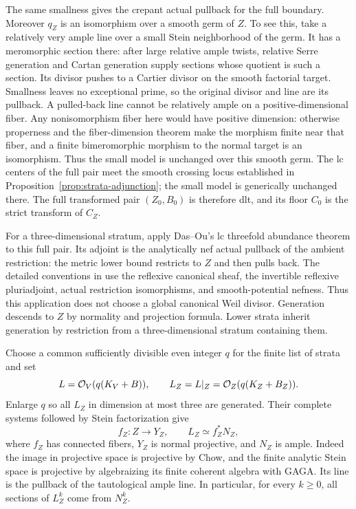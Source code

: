 The same smallness gives the crepant actual pullback for the full boundary.
Moreover \(q_Z\) is an isomorphism over a smooth germ of \(Z\).  To see
this, take a relatively very ample line over a small Stein neighborhood
of the germ.  It has a meromorphic section there: after large relative
ample twists, relative Serre generation and Cartan generation supply
sections whose quotient is such a section.  Its divisor pushes to a
Cartier divisor on the smooth factorial target.  Smallness leaves no
exceptional prime, so the original divisor and line are its pullback.
A pulled-back line cannot be relatively ample on a positive-dimensional
fiber.  Any nonisomorphism fiber here would have positive dimension:
otherwise properness and the fiber-dimension theorem make the morphism
finite near that fiber, and a finite bimeromorphic morphism to the normal
target is an isomorphism.  Thus the small model is unchanged over this
smooth germ.  The lc centers of the full pair meet the
smooth crossing locus established in
Proposition~\ref{prop:strata-adjunction}; the small model is generically
unchanged there.  The full transformed pair \((Z_0,B_0)\) is therefore
dlt, and its floor \(C_0\) is the strict transform of \(C_Z\).

For a three-dimensional stratum, apply Das--Ou's lc threefold abundance
theorem \cite[Corollary~1.3]{DasOu2025} to this full pair.  Its adjoint is
the analytically nef actual pullback of the ambient restriction: the
metric lower bound restricts to \(Z\) and then pulls back.  The detailed
conventions in \cite[Section~2.1]{DasOu2025} use the reflexive canonical
sheaf, the invertible reflexive pluriadjoint, actual restriction
isomorphisms, and smooth-potential nefness.  Thus this application does not
choose a global canonical Weil divisor.  Generation descends to \(Z\) by
normality and projection formula.  Lower strata inherit generation by
restriction from a three-dimensional stratum containing them.

Choose a common sufficiently divisible even integer \(q\) for the finite
list of strata and set
\[
 L=\mathcal O_V(q(K_V+B)),\qquad
 L_Z=L|_Z=\mathcal O_Z(q(K_Z+B_Z)).
\]
Enlarge \(q\) so all \(L_Z\) in dimension at most three are generated.
Their complete systems followed by Stein factorization give
\begin{equation}\label{eq:stratum-semiample-map}
 f_Z:Z\longrightarrow Y_Z,\qquad L_Z\simeq f_Z^*N_Z,
\end{equation}
where \(f_Z\) has connected fibers, \(Y_Z\) is normal projective, and
\(N_Z\) is ample.  Indeed the image in projective space is projective by
Chow, and the finite analytic Stein space is projective by algebraizing
its finite coherent algebra with GAGA.  Its line is the pullback of the
tautological ample line.  In particular, for every \(k\geq0\), all
sections of \(L_Z^k\) come from \(N_Z^k\).

